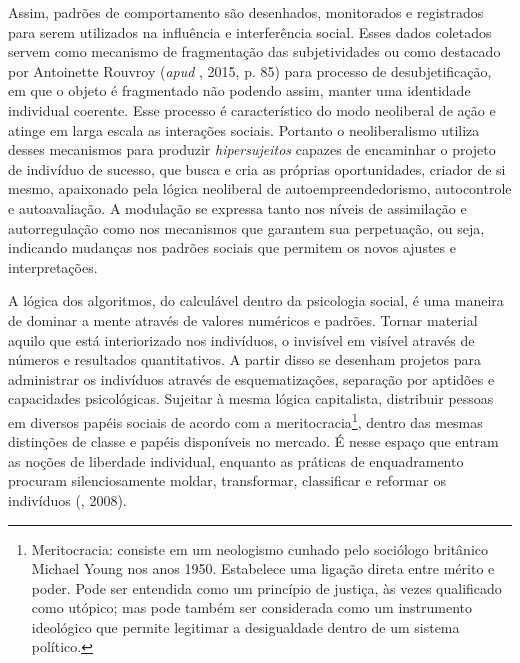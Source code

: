Assim, padrões de comportamento são desenhados, monitorados e
registrados para serem utilizados na influência e interferência social.
Esses dados coletados servem como mecanismo de fragmentação das
subjetividades ou como destacado por Antoinette Rouvroy (\emph{apud} ,
2015, p. 85) para processo de desubjetificação, em que o objeto é
fragmentado não podendo assim, manter uma identidade individual
coerente. Esse processo é característico do modo neoliberal de ação e
atinge em larga escala as interações sociais. Portanto o neoliberalismo
utiliza desses mecanismos para produzir \emph{hipersujeitos} capazes de
encaminhar o projeto de indivíduo de sucesso, que busca e cria as
próprias oportunidades, criador de si mesmo, apaixonado pela lógica
neoliberal de autoempreendedorismo, autocontrole e autoavaliação. A
modulação se expressa tanto nos níveis de assimilação e autorregulação
como nos mecanismos que garantem sua perpetuação, ou seja, indicando
mudanças nos padrões sociais que permitem os novos ajustes e
interpretações.

A lógica dos algoritmos, do calculável dentro da psicologia social, é
uma maneira de dominar a mente através de valores numéricos e padrões.
Tornar material aquilo que está interiorizado nos indivíduos, o
invisível em visível através de números e resultados quantitativos. A
partir disso se desenham projetos para administrar os indivíduos através
de esquematizações, separação por aptidões e capacidades psicológicas.
Sujeitar à mesma lógica capitalista, distribuir pessoas em diversos
papéis sociais de acordo com a meritocracia\footnote{Meritocracia:
  consiste em um neologismo cunhado pelo sociólogo britânico Michael
  Young nos anos 1950. Estabelece uma ligação direta entre mérito e
  poder. Pode ser entendida como um princípio de justiça, às vezes
  qualificado como utópico; mas pode também ser considerada como um
  instrumento ideológico que permite legitimar a desigualdade dentro de
  um sistema político.}, dentro das mesmas distinções de classe e papéis
disponíveis no mercado. É nesse espaço que entram as noções de liberdade
individual, enquanto as práticas de enquadramento procuram
silenciosamente moldar, transformar, classificar e reformar os
indivíduos (, 2008).

